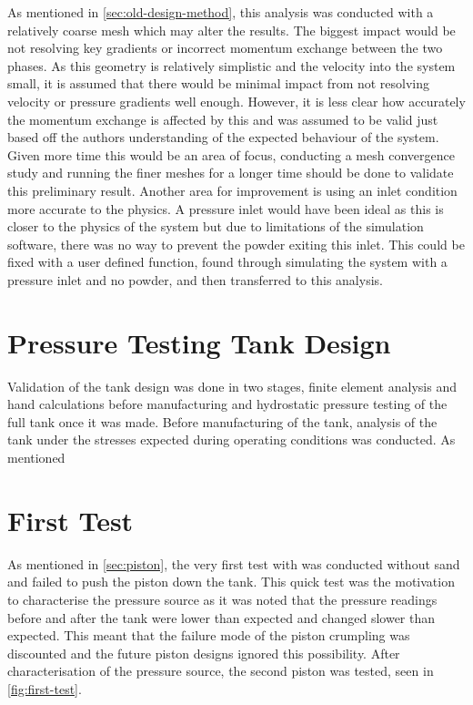 As mentioned in \autoref{sec:old-design-method}, this analysis was conducted with a relatively coarse mesh which may alter the results. The biggest impact would be not resolving key gradients or incorrect momentum exchange between the two phases. As this geometry is relatively simplistic and the velocity into the system small, it is assumed that there would be minimal impact from not resolving velocity or pressure gradients well enough. However, it is less clear how accurately the momentum exchange is affected by this and was assumed to be valid just based off the authors understanding of the expected behaviour of the system. Given more time this would be an area of focus, conducting a mesh convergence study and running the finer meshes for a longer time should be done to validate this preliminary result. Another area for improvement is using an inlet condition more accurate to the physics. A pressure inlet would have been ideal as this is closer to the physics of the system but due to limitations of the simulation software, there was no way to prevent the powder exiting this inlet. This could be fixed with a user defined function, found through simulating the system with a pressure inlet and no powder, and then transferred to this analysis.

\section{Pressure Testing Tank Design}\label{sec:pressure-testing}
Validation of the tank design was done in two stages, finite element analysis and hand calculations before manufacturing and hydrostatic pressure testing of the full tank once it was made.
Before manufacturing of the tank, analysis of the tank under the stresses expected during operating conditions was conducted. As mentioned
\section{First Test}\label{sec:first-test}
As mentioned in \autoref{sec:piston}, the very first test with was conducted without sand and failed to push the piston down the tank. This quick test was the motivation to characterise the pressure source as it was noted that the pressure readings before and after the tank were lower than expected and changed slower than expected. This meant that the failure mode of the piston crumpling was discounted and the future piston designs ignored this possibility. After characterisation of the pressure source, the second piston was tested, seen in \autoref{fig:first-test}. 

